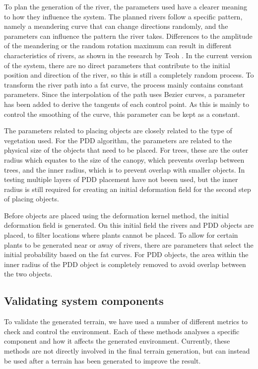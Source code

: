 To plan the generation of the river, the parameters used have a clearer meaning to how they influence the system. The planned rivers follow a specific pattern, namely a meandering curve that can change directions randomly, and the parameters can influence the pattern the river takes. Differences to the amplitude of the meandering or the random rotation maximum can result in different characteristics of rivers, as shown in the research by Teoh \cite{teoh_riverland_2009}. In the current version of the system, there are no direct parameters that contribute to the initial position and direction of the river, so this is still a completely random process.
To transform the river path into a fat curve, the process mainly contains constant parameters. Since the interpolation of the path uses Bezier curves, a parameter has been added to derive the tangents of each control point. As this is mainly to control the smoothing of the curve, this parameter can be kept as a constant.

The parameters related to placing objects are closely related to the type of vegetation used. For the PDD algorithm, the parameters are related to the physical size of the objects that need to be placed. For trees, these are the outer radius which equates to the size of the canopy, which prevents overlap between trees, and the inner radius, which is to prevent overlap with smaller objects. In testing multiple layers of PDD placement have not beeen used, but the inner radius is still required for creating an initial deformation field for the second step of placing objects.

Before objects are placed using the deformation kernel method, the initial deformation field is generated. On this initial field the rivers and PDD objects are placed, to filter locations where plants cannot be placed. To allow for certain plants to be generated near or away of rivers, there are parameters that select the initial probability based on the fat curves. For PDD objects, the area within the inner radius of the PDD object is completely removed to avoid overlap between the two objects.


\subsection{Validating system components}
To validate the generated terrain, we have used a number of different metrics to check and control the environment. Each of these methods analyses a specific component and how it affects the generated environment. Currently, these methods are not directly involved in the final terrain generation, but can instead be used after a terrain has been generated to improve the result.

